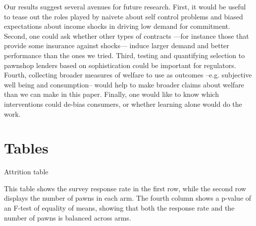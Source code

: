 \documentclass[oneside,11pt]{article}
\begin{document}
Our results suggest several avenues for future research. First, it would be useful to tease out the roles played by naivete about self control problems and biased expectations about income shocks in driving low demand for commitment. Second, one could ask whether other types of contracts ---for instance those that provide some insurance against shocks---  induce larger demand and better performance than the ones we tried. Third, testing and quantifying selection to pawnshop lenders based on sophistication could be important for regulators. Fourth, collecting broader measures of welfare to use as outcomes --e.g. subjective well being and consumption-- would help to make broader claims about welfare than we can make in this paper. Finally, one would like to know which interventions could de-bias consumers, or whether learning alone would do the work.







\newpage


\clearpage

%
%






\newpage
\singlespacing

\section{Tables}

\begin{table}[H]
\caption{Attrition table}
\label{attrition_table}
\begin{center}
\scriptsize{}
\end{center}
 \scriptsize This table shows the survey response rate in the first row, while the second row displays the number of pawns in each arm. The fourth column shows a p-value of an F-test of equality of means, showing that both the response rate and the number of pawns is balanced across arms. 
\end{table}
\end{document}
